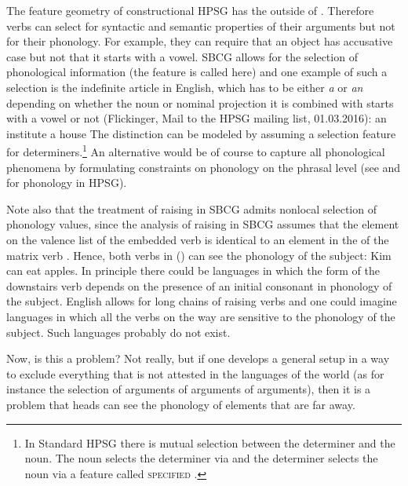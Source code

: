 \documentclass[output=paper]{langsci/langscibook}
\begin{document}

The feature geometry of constructional HPSG has the \phonv outside of \synsem. Therefore verbs can
select for syntactic and semantic properties of their arguments but not for their phonology. For
example, they can require that an object has accusative case but not that it starts with a
vowel. SBCG allows for the selection of phonological information (the feature is called \form here)
and one example of such a selection is the indefinite article in English, which has to be either \emph{a} or
\emph{an} depending on whether the noun or nominal projection it is combined with starts with a
vowel or not (Flickinger, Mail to the HPSG mailing list, 01.03.2016):
\eal
\ex an institute
\ex a  house
\zl
The distinction can be modeled by assuming a selection feature for determiners.\footnote{%
  In Standard HPSG there is mutual selection between the determiner and the noun. The noun selects
  the determiner via \spr and the determiner selects the noun via a feature called
  \textsc{specified} \citep[--54]{ps2}. 
} An alternative would be of course to capture all phonological phenomena by formulating constraints on phonology on the
phrasal level (see \citealp{BK94b} and \citealp{Walther99a-u} for phonology in HPSG).

Note also that the treatment of raising in SBCG admits nonlocal selection of phonology
values, since the analysis of raising in SBCG assumes that the element on the valence list of the
embedded verb is identical to an element in the \argstl of the matrix verb \citep[]{Sag2012a}. Hence, both verbs in () can see the phonology of the subject:
\ea
Kim can eat apples.
\z
In principle there could be languages in which the form of the downstairs verb depends on the
presence of an initial consonant in phonology of the subject. English allows for long chains of
raising verbs and one could imagine languages in which all the verbs on the way are sensitive to the
phonology of the subject. Such languages probably do not exist.

Now, is this a problem? Not really, but if one develops a general setup in a
way to exclude everything that is not attested in the languages of the world (as for instance the
selection of arguments of arguments of arguments), then it is a problem that heads can see the
phonology of elements that are far away.
\end{document}
